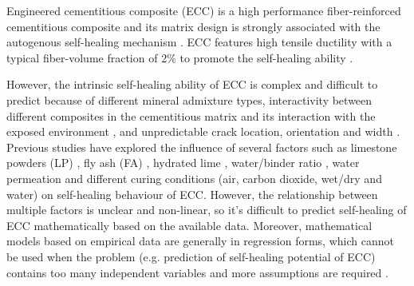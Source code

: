 \documentclass[11pt]{article}
\begin{document}
	
	Engineered cementitious composite (ECC) is a high performance fiber-reinforced cementitious composite and its matrix design is strongly associated with the autogenous self-healing mechanism \cite{kamada2000effects}. ECC features high tensile ductility with a typical fiber-volume fraction of 2\%  \cite{li1998innovations,ozbay2013self} to promote the self-healing ability \cite{tang2015robust}. 
	
	However, the intrinsic self-healing ability of ECC is complex and difficult to predict because of different mineral admixture types, interactivity between different composites in the cementitious matrix and its interaction with the exposed environment \cite{wu2012review}, and unpredictable crack location, orientation and width \cite{huang2013characterization}. Previous studies have explored the influence of several factors such as limestone powders (LP) \cite{suleiman2019visualization,zhou2008developing}, fly ash (FA) \cite{li2007self,zhang2014investigating}, hydrated lime \cite{yildirim2014influence}, water/binder ratio \cite{yang2005self}, water permeation \cite{sahmaran2007transport} and different curing conditions (air, carbon dioxide, wet/dry and water) \cite{qian2010influence} on self-healing behaviour of ECC. However, the relationship between multiple factors is unclear and non-linear, so it’s difficult to predict self-healing of ECC mathematically based on the available data. Moreover, mathematical models based on empirical data are generally in regression forms, which cannot be used when the problem (e.g. prediction of self-healing potential of ECC) contains too many independent variables and more assumptions are required  \cite{alshihri2009neural}.
	
\end{document}

